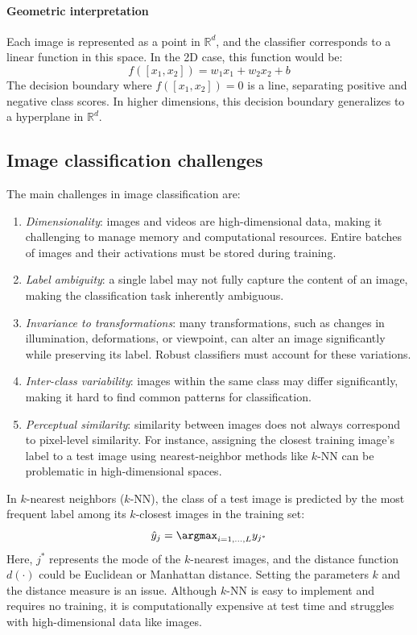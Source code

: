 \paragraph*{Geometric interpretation}
Each image is represented as a point in $\mathbb{R}^d$, and the classifier corresponds to a linear function in this space. 
In the 2D case, this function would be:
\[f([x_1,x_2])=w_1x_1+w_2x_2+b\]
The decision boundary where $f([x_1,x_2])=0$ is a line, separating positive and negative class scores.
In higher dimensions, this decision boundary generalizes to a hyperplane in $\mathbb{R}^d$. 

\subsection{Image classification challenges}
The main challenges in image classification are: 
\begin{enumerate}
    \item \textit{Dimensionality}: images and videos are high-dimensional data, making it challenging to manage memory and computational resources. 
        Entire batches of images and their activations must be stored during training.
    \item \textit{Label ambiguity}: a single label may not fully capture the content of an image, making the classification task inherently ambiguous.
    \item \textit{Invariance to transformations}: many transformations, such as changes in illumination, deformations, or viewpoint, can alter an image significantly while preserving its label. 
        Robust classifiers must account for these variations.
    \item \textit{Inter-class variability}: images within the same class may differ significantly, making it hard to find common patterns for classification.
    \item \textit{Perceptual similarity}: similarity between images does not always correspond to pixel-level similarity. 
        For instance, assigning the closest training image's label to a test image using nearest-neighbor methods like $k$-NN can be problematic in high-dimensional spaces.
\end{enumerate}
In $k$-nearest neighbors ($k$-NN), the class of a test image is predicted by the most frequent label among its $k$-closest images in the training set:
\[\hat{y}_j=\argmax_{i=1,\dots,L}y_{j^\ast}\]
Here, $j^\ast$ represents the mode of the $k$-nearest images, and the distance function $d(\cdot)$ could be Euclidean or Manhattan distance.
Setting the parameters $k$ and the distance measure is an issue. 
Although $k$-NN is easy to implement and requires no training, it is computationally expensive at test time and struggles with high-dimensional data like images.